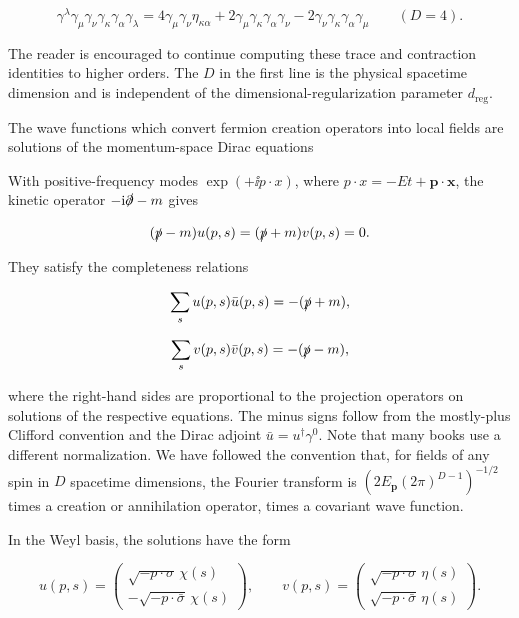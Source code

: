 \[
\gamma^\lambda\gamma_\mu\gamma_\nu\gamma_\kappa\gamma_\alpha\gamma_\lambda
=4\gamma_\mu\gamma_\nu\eta_{\kappa\alpha}
+2\gamma_\mu\gamma_\kappa\gamma_\alpha\gamma_\nu
-2\gamma_\nu\gamma_\kappa\gamma_\alpha\gamma_\mu
\qquad(D=4).
\]

The reader is encouraged to continue computing these trace and contraction identities
to higher orders. The $D$ in the first line is the physical spacetime dimension and is
independent of the dimensional-regularization parameter $d_{\mathrm{reg}}$.

The wave functions which convert fermion creation operators into local fields are
solutions of the momentum-space Dirac equations

With positive-frequency modes $\exp(+\ii p\mathbin{\cdot}x)$, where
$p\mathbin{\cdot}x=-Et+\mathbf p\mathbin{\cdot}\mathbf x$, the kinetic operator
$-\mathrm{i}\slashed\partial-m$ gives

\[
(\slashed p-m)u(p,s)=(\slashed p+m)v(p,s)=0.
\]

They satisfy the completeness relations

\[
\sum_su(p,s)\bar u(p,s)=-(\slashed p+m),
\]

\[
\sum_sv(p,s)\bar v(p,s)=-(\slashed p-m),
\]

where the right-hand sides are proportional to the projection operators on solutions
of the respective equations. The minus signs follow from the mostly-plus
Clifford convention and the Dirac adjoint $\bar u=u^\dagger\gamma^0$. Note that
many books use a different normalization. We have followed the convention that,
for fields of any spin in $D$ spacetime dimensions, the Fourier transform is
$(2E_{\mathbf p}(2\pi)^{D-1})^{-1/2}$ times a creation or annihilation operator,
times a covariant wave function.

In the Weyl basis, the solutions have the form

\[
u(p,s)=\begin{pmatrix}\sqrt{-p\cdot\sigma}\,\chi(s)\\[2pt]-\sqrt{-p\cdot\bar\sigma}\,\chi(s)\end{pmatrix},
\qquad
v(p,s)=\begin{pmatrix}\sqrt{-p\cdot\sigma}\,\eta(s)\\[2pt]\sqrt{-p\cdot\bar\sigma}\,\eta(s)\end{pmatrix}.
\]

